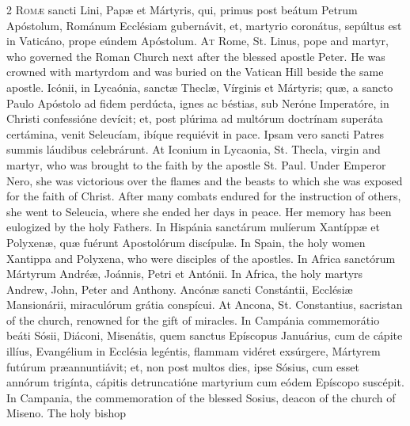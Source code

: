 \begin{paracol}{2}
\lettrine[lines=2]{R}{omæ} sancti Lini, Papæ 
 et Mártyris, qui, primus post beátum Petrum Apóstolum, Románum Ecclésiam 
 gubernávit, et, martyrio coronátus, sepúltus est in Vaticáno, prope eúndem 
 Apóstolum.
\switchcolumn
{}
\lettrine[lines=2]{A}{t} Rome, St. Linus, pope and martyr, 
 who governed the Roman Church next after the blessed apostle Peter. He 
 was crowned with martyrdom and was buried on the Vatican Hill beside the 
 same apostle.
\switchcolumn*
{}
Icónii, in Lycaónia, 
 sanctæ Theclæ, Vírginis et Mártyris; quæ, a sancto Paulo Apóstolo ad fidem 
 perdúcta, ignes ac béstias, sub Neróne Imperatóre, in Christi confessióne 
 devícit; et, post plúrima ad multórum doctrínam superáta certámina, venit 
 Seleucíam, ibíque requiévit in pace. Ipsam vero sancti Patres summis 
 láudibus celebrárunt.
\switchcolumn
{}
At Iconium in Lycaonia, St. Thecla, 
 virgin and martyr, who was brought to the faith by the apostle St. Paul. 
 Under Emperor Nero, she was victorious over the flames and the beasts to 
 which she was exposed for the faith of Christ. After many combats 
 endured for the instruction of others, she went to Seleucia, where she ended 
 her days in peace. Her memory has been eulogized by the holy Fathers.
\switchcolumn*
{}
In Hispánia sanctárum 
 mulíerum Xantíppæ et Polyxenæ, quæ fuérunt Apostolórum discípulæ.
\switchcolumn
{}
In Spain, the holy women Xantippa 
 and Polyxena, who were disciples of the apostles.
\switchcolumn*
{}
In Africa sanctórum 
 Mártyrum Andréæ, Joánnis, Petri et Antónii.
\switchcolumn
{}
In Africa, the holy martyrs Andrew, 
 John, Peter and Anthony.
\switchcolumn*
{}
Ancónæ sancti 
 Constántii, Ecclésiæ Mansionárii, miraculórum grátia conspícui.
\switchcolumn
{}
At Ancona, St. Constantius, 
 sacristan of the church, renowned for the gift of miracles.
\switchcolumn*
{}
In Campánia 
 commemorátio beáti Sósii, Diáconi, Misenátis, quem sanctus Epíscopus 
 Januárius, cum de cápite illíus, Evangélium in Ecclésia legéntis, flammam 
 vidéret exsúrgere, Mártyrem futúrum præannuntiávit; et, non post multos 
 dies, ipse Sósius, cum esset annórum trigínta, cápitis detruncatióne 
 martyrium cum eódem Epíscopo suscépit.
\switchcolumn
{}
In Campania, the commemoration of 
 the blessed Sosius, deacon of the church of Miseno. The holy bishop 

\end{paracol}
